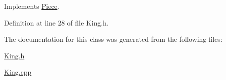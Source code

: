 Implements \hyperlink{class_piece_a4c717dfd8c910e2088bee2c4c6792c10}{Piece}.



Definition at line 28 of file King.\+h.



The documentation for this class was generated from the following files\+:\begin{DoxyCompactItemize}
\item 
\hyperlink{_king_8h}{King.\+h}\item 
\hyperlink{_king_8cpp}{King.\+cpp}\end{DoxyCompactItemize}
